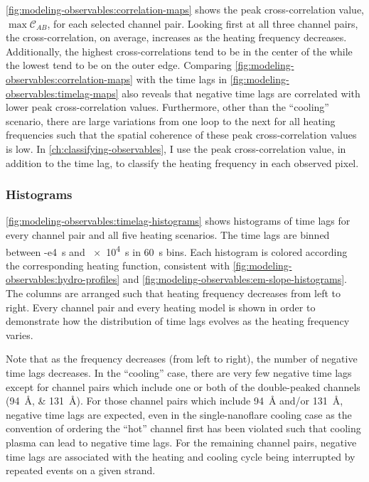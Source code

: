 \autoref{fig:modeling-observables:correlation-maps} shows the peak cross-correlation value, $\max\mathcal{C}_{AB}$, for each selected channel pair. Looking first at all three channel pairs, the cross-correlation, on average, increases as the heating frequency decreases. Additionally, the highest cross-correlations tend to be in the center of the \AR{} while the lowest tend to be on the outer edge. Comparing \autoref{fig:modeling-observables:correlation-maps} with the time lags in \autoref{fig:modeling-observables:timelag-maps} also reveals that negative time lags are correlated with lower peak cross-correlation values. Furthermore, other than the ``cooling'' scenario, there are large variations from one loop to the next for all heating frequencies such that the spatial coherence of these peak cross-correlation values is low. In \autoref{ch:classifying-observables}, I use the peak cross-correlation value, in addition to the time lag, to classify the heating frequency in each observed pixel.

\subsubsection{Histograms}\label{sec:modeling-observables:histograms}

\autoref{fig:modeling-observables:timelag-histograms} shows histograms of time lags for every channel pair and all five heating scenarios. The time lags are binned between \SI{-e4}{\second} and \SI{e4}{\second} in \SI{60}{\second} bins. Each histogram is colored according the corresponding heating function, consistent with \autoref{fig:modeling-observables:hydro-profiles} and \autoref{fig:modeling-observables:em-slope-histograms}. The columns are arranged such that heating frequency decreases from left to right. Every channel pair and every heating model is shown in order to demonstrate how the distribution of time lags evolves as the heating frequency varies.

Note that as the frequency decreases (from left to right), the number of negative time lags decreases. In the ``cooling'' case, there are very few negative time lags except for channel pairs which include one or both of the double-peaked channels (\SIlist{94;131}{\angstrom}). For those channel pairs which include \SI{94}{\angstrom} and/or \SI{131}{\angstrom}, negative time lags are expected, even in the single-nanoflare cooling case as the convention of ordering the ``hot'' channel first has been violated such that cooling plasma can lead to negative time lags. For the remaining channel pairs, negative time lags are associated with the heating and cooling cycle being interrupted by repeated events on a given strand.

